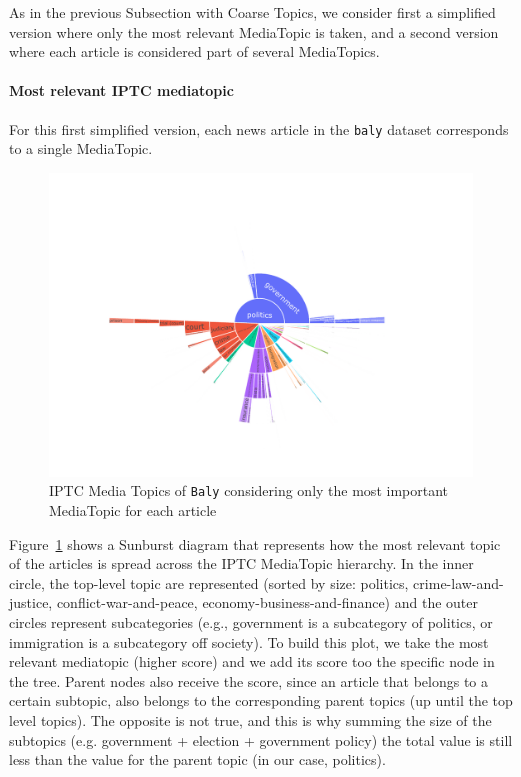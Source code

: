 






As in the previous Subsection with Coarse Topics, we consider first a simplified version where only the most relevant MediaTopic is taken, and a second version where each article is considered part of several MediaTopics.


\paragraph{Most relevant IPTC mediatopic}

For this first simplified version, each news article in the \texttt{baly} dataset corresponds to a single MediaTopic.

\begin{figure}[!htbp]
    \centering
    \includegraphics[width=\linewidth]{figures/baly_iptc_only_first.pdf}
    \caption{IPTC Media Topics of \texttt{Baly} considering only the most important MediaTopic for each article}
    \label{fig:baly_iptc_only_first}
\end{figure}

Figure~\ref{fig:baly_iptc_only_first} shows a Sunburst diagram that represents how the most relevant topic of the articles is spread across the IPTC MediaTopic hierarchy.
In the inner circle, the top-level topic are represented (sorted by size: politics, crime-law-and-justice, conflict-war-and-peace, economy-business-and-finance) and the outer circles represent subcategories (e.g., government is a subcategory of politics, or immigration is a subcategory off society).
To build this plot, we take the most relevant mediatopic (higher score) and we add its score too the specific node in the tree. Parent nodes also receive the score, since an article that belongs to a certain subtopic, also belongs to the corresponding parent topics (up until the top level topics). The opposite is not true, and this is why summing the size of the subtopics (e.g. government + election + government policy) the total value is still less than the value for the parent topic (in our case, politics).

